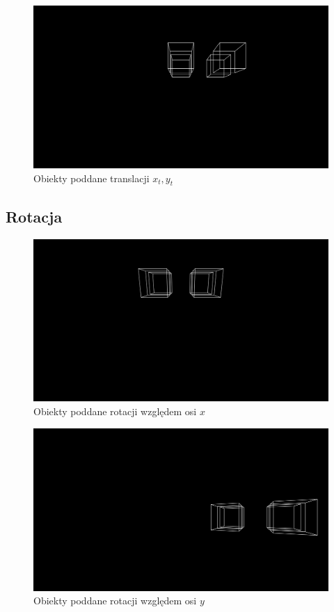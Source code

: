 \documentclass{article}
\begin{document}
        \begin{figure}[h]
            \includegraphics[width=\textwidth]{translation}
            \caption{Obiekty poddane translacji \(x_t, y_t\)}
            \centering
        \end{figure}

    \subsection{Rotacja}

        \begin{figure}
            \includegraphics[width=\textwidth]{rotate_x}
            \caption{Obiekty poddane rotacji względem osi \(x\)}
            \centering
        \end{figure}

        \begin{figure}
            \includegraphics[width=\textwidth]{rotate_y}
            \caption{Obiekty poddane rotacji względem osi \(y\)}
            \centering
        \end{figure}
\end{document}
